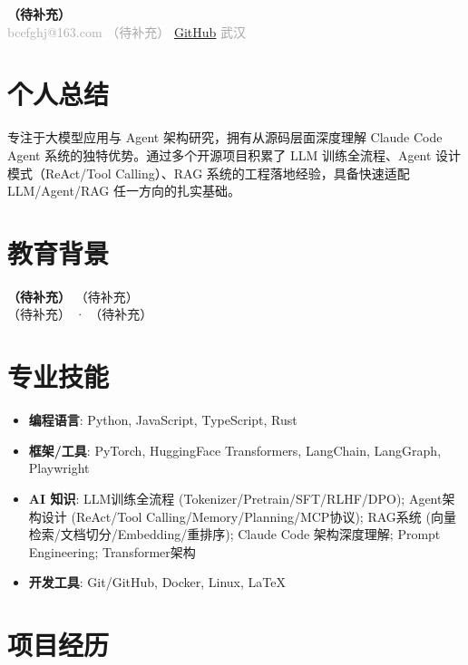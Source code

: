 \documentclass[11pt,a4paper]{article}
\begin{document}
\begin{center}
  {\Huge\bfseries （待补充）}\\[6pt]
  \textcolor{darkgray}{
    bcefghj@163.com \quad
    （待补充） \quad
    \href{https://github.com/bcefghj}{GitHub} \quad
    武汉
  }
\end{center}

\vspace{-4pt}

\section{个人总结}
专注于大模型应用与 Agent 架构研究，拥有从源码层面深度理解 Claude Code Agent 系统的独特优势。通过多个开源项目积累了 LLM 训练全流程、Agent 设计模式（ReAct/Tool Calling）、RAG 系统的工程落地经验，具备快速适配 LLM/Agent/RAG 任一方向的扎实基础。


\section{教育背景}

\noindent\textbf{（待补充）} \hfill （待补充） \\
（待补充） · （待补充） 




\section{专业技能}
\begin{itemize}
  \item \textbf{编程语言}: Python, JavaScript, TypeScript, Rust
  \item \textbf{框架/工具}: PyTorch, HuggingFace Transformers, LangChain, LangGraph, Playwright
  \item \textbf{AI 知识}: LLM训练全流程 (Tokenizer/Pretrain/SFT/RLHF/DPO); Agent架构设计 (ReAct/Tool Calling/Memory/Planning/MCP协议); RAG系统 (向量检索/文档切分/Embedding/重排序); Claude Code 架构深度理解; Prompt Engineering; Transformer架构
  \item \textbf{开发工具}: Git/GitHub, Docker, Linux, LaTeX
\end{itemize}

\section{项目经历}
\end{document}

